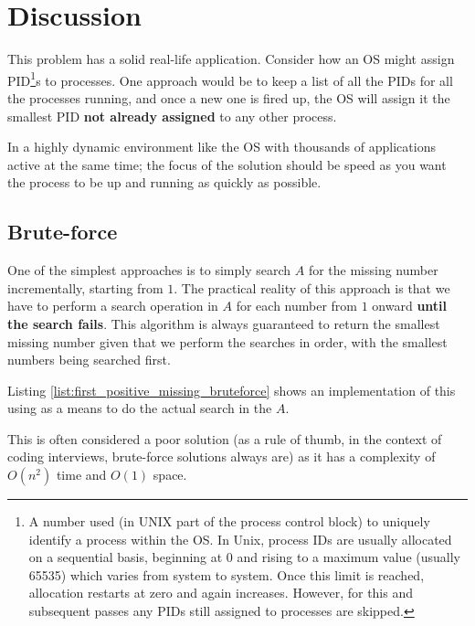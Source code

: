 \section{Discussion}
\label{first_positive_missing:sec:discussion}
This problem has a solid real-life application.
Consider how an OS might assign PID\footnote{A number used (in UNIX part of the process control block) to uniquely identify a process within the OS. In Unix, process IDs are usually allocated on a sequential basis, beginning at 0 and rising to a maximum value (usually 65535) which varies from system to system. Once this limit is reached, allocation restarts at zero and again increases. However, for this and subsequent passes any PIDs still assigned to processes are skipped.}s to processes. One approach would be to keep a list of all the PIDs for all the processes running, and once a new one is fired up, the OS will assign it the smallest PID \textbf{not already assigned} to any other process. 

In a highly dynamic environment like the OS with thousands of applications active at the same time; the focus of the solution should be speed as you want the process to be up and running as quickly as possible. 


\subsection{Brute-force}
One of the simplest approaches is to simply search $A$ for the missing number incrementally,  starting from $1$. 
The practical reality of this approach is that we have to perform a search operation in $A$ for each number from $1$ onward \textbf{until the search fails}.
This algorithm is always guaranteed to return the smallest missing number given that we perform the searches in order, with the smallest numbers being searched first. 

Listing \ref{list:first_positive_missing_bruteforce} shows an implementation of this using  as a means to do the actual search in the $A$. 
 


This is often considered a poor solution (as a rule of thumb, in the context of coding interviews, brute-force solutions always are) as it has a
complexity of $O(n^2)$ time and $O(1)$ space.

